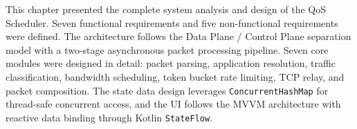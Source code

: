 This chapter presented the complete system analysis and design of the QoS Scheduler. Seven functional requirements and five non-functional requirements were defined. The architecture follows the Data Plane / Control Plane separation model with a two-stage asynchronous packet processing pipeline. Seven core modules were designed in detail: packet parsing, application resolution, traffic classification, bandwidth scheduling, token bucket rate limiting, TCP relay, and packet composition. The state data design leverages \texttt{ConcurrentHashMap} for thread-safe concurrent access, and the UI follows the MVVM architecture with reactive data binding through Kotlin \texttt{StateFlow}.
